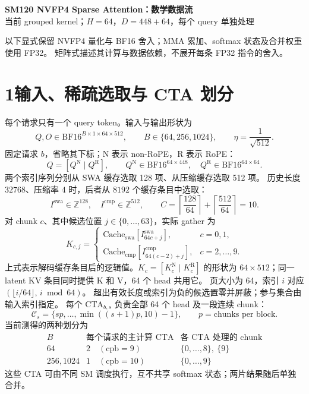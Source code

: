 \documentclass[UTF8,fontset=fandol,a4paper,10pt]{ctexart}
\newcommand{\BF}{\mathrm{BF16}}
\newcommand{\N}{\mathrm{N}}
\newcommand{\R}{\mathrm{R}}
\newcommand{\CTA}{\mathrm{CTA}}
\begin{document}
\begin{center}
  {\Large\bfseries SM120 NVFP4 Sparse Attention：数学数据流}\\[3pt]
  {\small 当前 grouped kernel；$H=64$，$D=448+64$，每个 query 单独处理}
\end{center}

以下显式保留 NVFP4 量化与 BF16 舍入；MMA 累加、softmax 状态及合并权重使用 FP32。
矩阵式描述其计算与数据依赖，不展开每条 FP32 指令的舍入。

\section*{1\quad 输入、稀疏选取与 CTA 划分}

每个请求只有一个 query token。输入与输出形状为
\[
  Q,O\in\BF^{B\times1\times64\times512},\qquad
  B\in\{64,256,1024\},\qquad \eta=\frac1{\sqrt{512}}.
\]
固定请求 $b$，省略其下标；$\N$ 表示 non-RoPE，$\R$ 表示 RoPE：
\[
  Q=[Q^{\N}\mid Q^{\R}],\qquad
  Q^{\N}\in\BF^{64\times448},\quad Q^{\R}\in\BF^{64\times64}.
\]
两个索引序列分别从 SWA 缓存选取 128 项、从压缩缓存选取 512 项。
历史长度 $32768$、压缩率 $4$ 时，后者从 $8192$ 个缓存条目中选取：
\[
  I^{\mathrm{swa}}\in\mathbb Z^{128},\quad
  I^{\mathrm{cmp}}\in\mathbb Z^{512},\qquad
  C=\left\lceil\frac{128}{64}\right\rceil+
    \left\lceil\frac{512}{64}\right\rceil=10.
\]
对 chunk $c$、其中候选位置 $j\in\{0,\ldots,63\}$，实际 gather 为
\[
  K_{c,j}=
  \begin{cases}
    \mathrm{Cache}_{\mathrm{swa}}[I^{\mathrm{swa}}_{64c+j}],&c=0,1,\\
    \mathrm{Cache}_{\mathrm{cmp}}[I^{\mathrm{cmp}}_{64(c-2)+j}],&c=2,\ldots,9.
  \end{cases}
\]
上式表示解码缓存条目后的逻辑值。$K_c=[K_c^{\N}\mid K_c^{\R}]$ 的形状为
$64\times512$；同一 latent KV 条目同时提供 K 和 V，64 个 head 共用它。
页大小为 64，索引 $i$ 对应 $(\lfloor i/64\rfloor,\,i\bmod64)$。
超出有效长度或索引为负的候选置零并屏蔽；参与集合由输入索引指定。
每个 $\CTA_{b,s}$ 负责全部 64 个 head 及一段连续 chunk：
\[
  \mathcal C_s=\{sp,\ldots,\min((s+1)p,10)-1\},
  \qquad p=\text{chunks per block}.
\]
当前测得的两种划分为
\[
  \begin{array}{c|c|c}
    B&\text{每个请求的主计算 CTA}&\text{各 CTA 处理的 chunk}\\\hline
    64&2\quad(\mathrm{cpb}=9)&\{0,\ldots,8\},\ \{9\}\\
    256,1024&1\quad(\mathrm{cpb}=10)&\{0,\ldots,9\}
  \end{array}
\]
这些 CTA 可由不同 SM 调度执行，互不共享 softmax 状态；两片结果随后单独合并。
\end{document}
